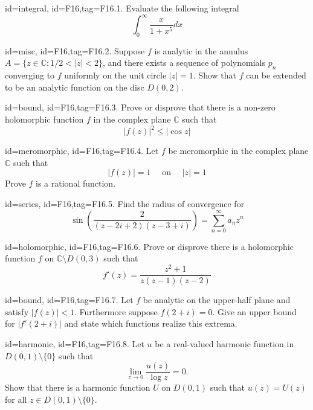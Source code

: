 \documentclass[12pt,letterpaper]{article}
\theoremstyle{plain}
\theoremstyle{definition}
\begin{document}
{%

\item[id=integral, id=F16,tag=F16.1.]
Evaluate the following integral
\[
	\int_{0}^{\infty} \frac{x}{1+x^5} dx
\]
\item[id=misc, id=F16,tag=F16.2.]
Suppose $f$ is analytic in the annulus $A = \{z \in \mathbb{C} \colon 1/2 < | z | < 2\}$, and there exists a sequence of polynomials $p_n$ converging to $f$ uniformly on the unit circle $| z | = 1$. Show that $f$ can be extended to be an analytic function on the disc $D(0,2)$.
\item[id=bound, id=F16,tag=F16.3.]
Prove or disprove that there is a non-zero holomorphic function $f$ in the complex plane $\mathbb{C}$ such that
\[
	| f(z) |^2 \le | \cos z |
\]
\item[id=meromorphic, id=F16,tag=F16.4.]
Let $f$ be meromorphic in the complex plane $\mathbb{C}$ such that
\[
	| f(z) | = 1 \quad \text{ on } \quad | z | = 1
\]
Prove $f$ is a rational function.
	
\item[id=series, id=F16,tag=F16.5.]
Find the radius of convergence for
\[
	\sin\left(\frac{2}{(z-2i+2)(z-3+i)}\right) = \sum_{n=0}^{\infty} a_n z^n
\]
\item[id=holomorphic, id=F16,tag=F16.6.]
Prove or disprove there is a holomorphic function $f$ on $\mathbb{C} \setminus D(0,3)$ such that
\[
	f'(z) = \frac{z^2 + 1}{z(z-1)(z-2)}
\]
\item[id=bound, id=F16,tag=F16.7.]
Let $f$ be analytic on the upper-half plane and satisfy $| f(z) | < 1$. Furthermore suppose $f(2+i) = 0$. Give an upper bound for $| f'(2+i) |$ and state which functions realize this extrema.
\item[id=harmonic, id=F16,tag=F16.8.]
Let $u$ be a real-valued harmonic function in $\overline{D(0,1)} \setminus \{0\}$ such that
\[
	\lim_{z\rightarrow 0} \frac{u(z)}{\log z} = 0.
\]
Show that there is a harmonic function $U$ on $D(0,1)$ such that $u(z) = U(z)$ for all $z \in D(0,1) \setminus \{0\}$.


}
\end{document}
